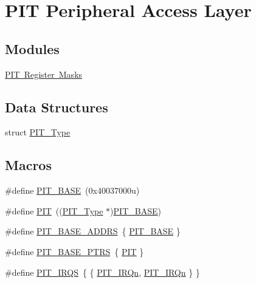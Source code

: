 \hypertarget{group___p_i_t___peripheral___access___layer}{}\section{P\+IT Peripheral Access Layer}
\label{group___p_i_t___peripheral___access___layer}
\subsection*{Modules}
\begin{DoxyCompactItemize}
\item 
\mbox{\hyperlink{group___p_i_t___register___masks}{P\+I\+T Register Masks}}
\end{DoxyCompactItemize}
\subsection*{Data Structures}
\begin{DoxyCompactItemize}
\item 
struct \mbox{\hyperlink{struct_p_i_t___type}{P\+I\+T\+\_\+\+Type}}
\end{DoxyCompactItemize}
\subsection*{Macros}
\begin{DoxyCompactItemize}
\item 
\#define \mbox{\hyperlink{group___p_i_t___peripheral___access___layer_gaf00b86ba33a2cfe7bb100b4f01905f41}{P\+I\+T\+\_\+\+B\+A\+SE}}~(0x40037000u)
\item 
\#define \mbox{\hyperlink{group___p_i_t___peripheral___access___layer_gaf181c9e6602b6432a0bf1a9243808968}{P\+IT}}~((\mbox{\hyperlink{struct_p_i_t___type}{P\+I\+T\+\_\+\+Type}} $\ast$)\mbox{\hyperlink{group___p_i_t___peripheral___access___layer_gaf00b86ba33a2cfe7bb100b4f01905f41}{P\+I\+T\+\_\+\+B\+A\+SE}})
\item 
\#define \mbox{\hyperlink{group___p_i_t___peripheral___access___layer_ga79085fa95893e4423661373b7be2f0a7}{P\+I\+T\+\_\+\+B\+A\+S\+E\+\_\+\+A\+D\+D\+RS}}~\{ \mbox{\hyperlink{group___p_i_t___peripheral___access___layer_gaf00b86ba33a2cfe7bb100b4f01905f41}{P\+I\+T\+\_\+\+B\+A\+SE}} \}
\item 
\#define \mbox{\hyperlink{group___p_i_t___peripheral___access___layer_ga403e0ed71b80cfe3e085fe6b56b5eff0}{P\+I\+T\+\_\+\+B\+A\+S\+E\+\_\+\+P\+T\+RS}}~\{ \mbox{\hyperlink{group___p_i_t___peripheral___access___layer_gaf181c9e6602b6432a0bf1a9243808968}{P\+IT}} \}
\item 
\#define \mbox{\hyperlink{group___p_i_t___peripheral___access___layer_ga5f0ae6317a2c8c12e46e49c6e2e29dda}{P\+I\+T\+\_\+\+I\+R\+QS}}~\{ \{ \mbox{\hyperlink{group___interrupt__vector__numbers_gga666eb0caeb12ec0e281415592ae89083abbb108c2729a964669d647df5c52b357}{P\+I\+T\+\_\+\+I\+R\+Qn}}, \mbox{\hyperlink{group___interrupt__vector__numbers_gga666eb0caeb12ec0e281415592ae89083abbb108c2729a964669d647df5c52b357}{P\+I\+T\+\_\+\+I\+R\+Qn}} \} \}
\end{DoxyCompactItemize}


